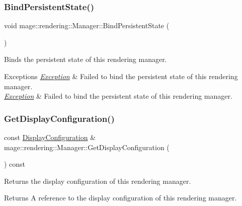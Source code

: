 \subsubsection{\texorpdfstring{Bind\+Persistent\+State()}{BindPersistentState()}}
{\footnotesize\ttfamily void mage\+::rendering\+::\+Manager\+::\+Bind\+Persistent\+State (\begin{DoxyParamCaption}{ }\end{DoxyParamCaption})}

Binds the persistent state of this rendering manager.


\begin{DoxyExceptions}{Exceptions}
{\em \mbox{\hyperlink{classmage_1_1_exception}{Exception}}} & Failed to bind the persistent state of this rendering manager. \\
\hline
{\em \mbox{\hyperlink{classmage_1_1_exception}{Exception}}} & Failed to bind the persistent state of this rendering manager. \\
\hline
\end{DoxyExceptions}
\mbox{\label{classmage_1_1rendering_1_1_manager_ac316fed528d23c8234dc3457beb3ed33}} 
\subsubsection{\texorpdfstring{Get\+Display\+Configuration()}{GetDisplayConfiguration()}}
{\footnotesize\ttfamily const \mbox{\hyperlink{classmage_1_1rendering_1_1_display_configuration}{Display\+Configuration}} \& mage\+::rendering\+::\+Manager\+::\+Get\+Display\+Configuration (\begin{DoxyParamCaption}{ }\end{DoxyParamCaption}) const\hspace{0.3cm}{\ttfamily [noexcept]}}

Returns the display configuration of this rendering manager.

\begin{DoxyReturn}{Returns}
A reference to the display configuration of this rendering manager. 
\end{DoxyReturn}
\mbox{\label{classmage_1_1rendering_1_1_manager_a9f696201405be6ebcd3805184535cefe}} 
